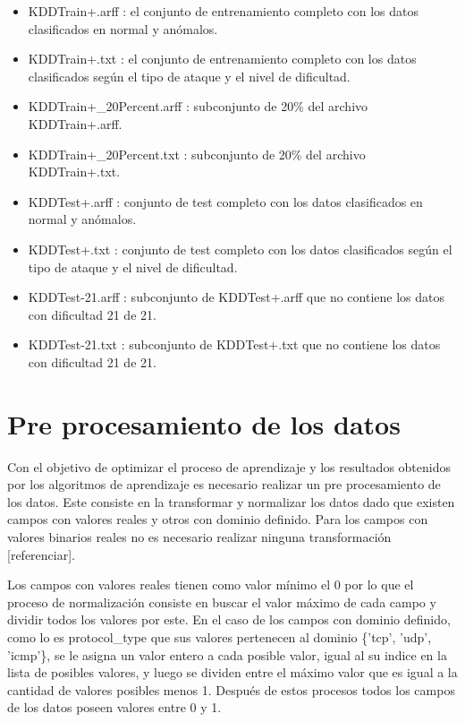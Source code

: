 \begin{itemize}
    \item KDDTrain+.arff : el conjunto de entrenamiento completo con los datos clasificados en normal y anómalos.
    \item KDDTrain+.txt : el conjunto de entrenamiento completo con los datos clasificados según el tipo de ataque y el nivel de dificultad.
    \item KDDTrain+\_20Percent.arff : subconjunto de 20\% del archivo KDDTrain+.arff.
    \item KDDTrain+\_20Percent.txt : subconjunto de 20\% del archivo KDDTrain+.txt.
    \item KDDTest+.arff : conjunto de test completo con los datos clasificados en normal y anómalos.
    \item KDDTest+.txt : conjunto de test completo con los datos clasificados según el tipo de ataque y el nivel de dificultad.
    \item KDDTest-21.arff : subconjunto de KDDTest+.arff que no contiene los datos con dificultad 21 de 21.
    \item KDDTest-21.txt : subconjunto de KDDTest+.txt que no contiene los datos con dificultad 21 de 21.
\end{itemize}

\section{Pre procesamiento de los datos}
Con el objetivo de optimizar el proceso de aprendizaje y los resultados obtenidos por los algoritmos de aprendizaje es necesario realizar un pre procesamiento de los datos. Este consiste en la transformar y normalizar los datos dado que existen campos con valores reales y otros con dominio definido. Para los campos con valores binarios reales no es necesario realizar ninguna transformación [referenciar].

Los campos con valores reales tienen como valor mínimo el 0 por lo que el proceso de normalización consiste en buscar el valor máximo de cada campo y dividir todos los valores por este. En el caso de los campos con dominio definido, como lo es protocol\_type que sus valores pertenecen al dominio \{'tcp', 'udp', 'icmp'\}, se le asigna un valor entero a cada posible valor, igual al su indice en la lista de posibles valores, y luego se dividen entre el máximo valor que es igual a la cantidad de valores posibles menos 1. Después de estos procesos todos los campos de los datos poseen valores entre 0 y 1.

